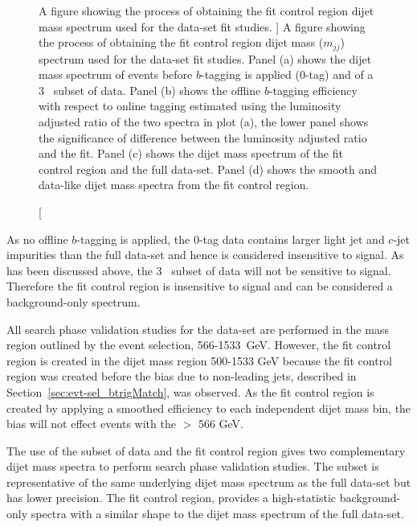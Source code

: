 \begin{figure}[!htb]
{}
\hspace{-2mm}
\vspace{-1em}
\caption
    [A figure showing the process of obtaining the fit control region dijet mass spectrum
      used for the \lm{} data-set fit studies.
    ]
    {\label{fig:fittingCR}
      A figure showing the process of obtaining the fit control region dijet mass ($m_{jj}$) spectrum
      used for the \lm{} data-set fit studies.
      Panel (a) shows the dijet mass spectrum of events before $b$-tagging is applied (0-tag) and of a 3~\ifb{} subset of \lm{} data.
      Panel (b) shows the offline $b$-tagging efficiency with respect to online tagging estimated using the luminosity adjusted ratio of the two spectra in plot (a),
      the lower panel shows the significance of difference between the luminosity adjusted ratio and the fit.
      Panel (c) shows the dijet mass spectrum of the fit control region and the full \lm{} data-set.
      Panel (d) shows the smooth and data-like dijet mass spectra from the fit control region.
}
\end{figure}

As no offline $b$-tagging is applied,
the 0-tag data contains larger light jet and $c$-jet impurities than the full \lm{} data-set
and hence is considered insensitive to signal.
As has been discussed above, the  3~\ifb{} subset of data will not be sensitive to signal.
Therefore the fit control region is insensitive to signal and can be considered a background-only spectrum.

All search phase validation studies for the \lm{} data-set are performed in the mass region outlined by the \lm{} event selection, 566-1533~GeV.
However, the fit control region is created in the dijet mass region 500-1533 GeV
because the fit control region was created before the bias due to non-leading jets, described in Section~\ref{sec:evt-sel_btrigMatch}, was observed.
As the fit control region is created by applying a smoothed efficiency to each independent dijet mass bin,
the bias will not effect events with the \mjj{} $>$ 566 GeV.

The use of the subset of data and the fit control region gives two complementary dijet mass spectra to perform search phase validation studies.
The subset is representative of the same underlying dijet mass spectrum as the full \lm{} data-set but has lower precision.
The fit control region, provides a high-statistic background-only spectra with a similar shape to the dijet mass spectrum of the full \lm{} data-set.


